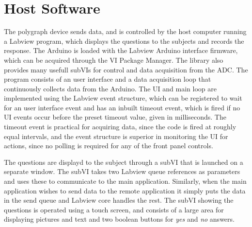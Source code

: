 \documentclass[a4paper,11pt]{article}
\begin{document}
\section{Host Software}
The polygraph device sends data, and is controlled by the host
computer running a Labview program, which displays the questions to
the subjects and records the response. The Arduino is loaded with the
Labview Arduino interface firmware, which can be acquired through the
VI Package Manager. The library also provides many usefull subVIs for
control and data acquisition from the ADC. The program consists of an
user interface and a data acquisition loop that continuously collects
data from the Arduino. The UI and main loop are implemented using the
Labview event structure, which can be registered to wait for an user
interface event and has an inbuilt timeout event, which is fired if no
UI events occur before the preset timeout value, given in
milliseconds. The timeout event is practical for acquiring data, since
the code is fired at roughly equal intervals, and the event structure
is superior in monitoring the UI for actions, since no polling is
required for any of the front panel controls.

The questions are displayd to the subject through a subVI that is
launched on a separate window. The subVI takes two Labview queue
references as parameters and uses these to communicate to the main
application. Similarly, when the main application wishes to send data
to the remote application it simply puts the data in the send queue
and Labview core handles the rest. The subVI showing the questions is
operated using a touch screen, and consists of a large area for
displaying pictures and text and two boolean buttons for \emph{yes}
and \emph{no} answers.
\end{document}
